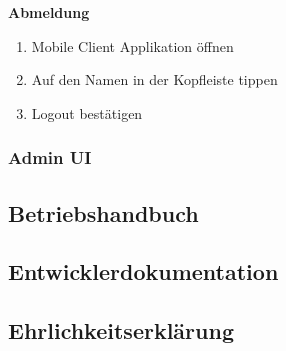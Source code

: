         \textbf{Abmeldung}

        \begin{enumerate}
            \item Mobile Client Applikation öffnen
            \item Auf den Namen in der Kopfleiste tippen
            \item Logout bestätigen
        \end{enumerate}



\subsubsection*{Admin UI}

    \subsection{Betriebshandbuch}
    \subsection{Entwicklerdokumentation}
    \subsection{Ehrlichkeitserklärung}
